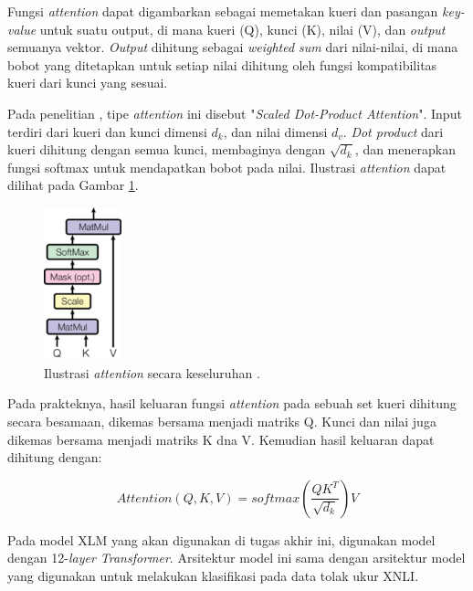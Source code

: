     Fungsi \textit{attention} dapat digambarkan sebagai memetakan kueri dan pasangan \textit{key-value} untuk suatu output, di mana kueri (Q), kunci (K), nilai (V), dan \textit{output} semuanya vektor. \textit{Output} dihitung sebagai \textit{weighted sum} dari nilai-nilai, di mana bobot yang ditetapkan untuk setiap nilai dihitung oleh fungsi kompatibilitas kueri dari kunci yang sesuai.

    Pada penelitian \parencite{AttentionVaswani2017}, tipe \textit{attention} ini disebut "\textit{Scaled Dot-Product Attention}". Input terdiri dari kueri dan kunci dimensi \(d_{k}\), dan nilai dimensi \(d_{v}\). \textit{Dot product} dari kueri dihitung dengan semua kunci, membaginya dengan \(\sqrt{d_{k}}\), dan menerapkan fungsi softmax untuk mendapatkan bobot pada nilai. Ilustrasi \textit{attention} dapat dilihat pada Gambar \ref{fig:ilustrasi_attention}.

    \begin{figure}[ht]
        \centering
        \includegraphics[width=0.2\textwidth]{resources/overview-attention.png}
        \caption{Ilustrasi \textit{attention} secara keseluruhan \parencite{AttentionVaswani2017}.}
        \label{fig:ilustrasi_attention}
    \end{figure}

    Pada prakteknya, hasil keluaran fungsi \textit{attention} pada sebuah set kueri dihitung secara besamaan, dikemas bersama menjadi matriks Q. Kunci dan nilai juga dikemas bersama menjadi matriks K dna V. Kemudian hasil keluaran dapat dihitung dengan:

    \begin{equation}
        Attention(Q,K,V) = softmax(\frac{QK^{T}}{\sqrt{d_k}})V
    \end{equation}

    Pada model XLM yang akan digunakan di tugas akhir ini, digunakan model dengan 12-\textit{layer Transformer}. Arsitektur model ini sama dengan arsitektur model yang digunakan \parencite{LampleConneau2019} untuk melakukan klasifikasi pada data tolak ukur XNLI.

